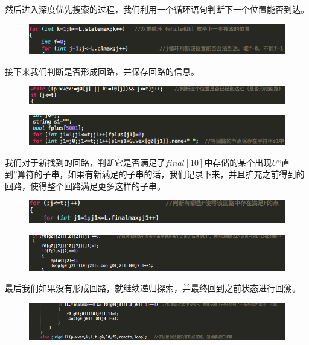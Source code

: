 \documentclass[UTF8]{ctexart}
\begin{document}
然后进入深度优先搜索的过程，我们利用一个循环语句判断下一个位置能否到达。

\begin{figure}[!htb]
\centering
\includegraphics[scale=0.5]{4.png}
\end{figure}

接下来我们判断是否形成回路，并保存回路的信息。

\begin{figure}[!htb]
\centering
\includegraphics[scale=0.5]{5.png}
\end{figure}

\begin{figure}[!htb]
\centering
\includegraphics[scale=0.5]{6.png}
\end{figure}

我们对于新找到的回路，判断它是否满足了$final[10]$中存储的某个出现$U$“直到”算符的子串，如果有新满足的子串的话，我们记录下来，并且扩充之前得到的回路，使得整个回路满足更多这样的子串。

\begin{figure}[!htb]
\centering
\includegraphics[scale=0.5]{7.png}
\end{figure}

\begin{figure}[!htb]
\centering
\includegraphics[scale=0.5]{8.png}
\end{figure}

最后我们如果没有形成回路，就继续递归探索，并最终回到之前状态进行回溯。

\begin{figure}[!htb]
\centering
\includegraphics[scale=0.5]{9.png}
\end{figure}
\end{document}
